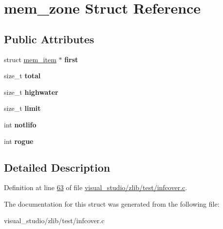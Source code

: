 \hypertarget{structmem__zone}{}\section{mem\+\_\+zone Struct Reference}
\label{structmem__zone}
\subsection*{Public Attributes}
\begin{DoxyCompactItemize}
\item 
\mbox{\label{structmem__zone_a6857b4ff436075363547bc5828b3098d}} 
struct \hyperlink{structmem__item}{mem\+\_\+item} $\ast$ {\bfseries first}
\item 
\mbox{\label{structmem__zone_a6b70eb61d9853f1280d51c0e30464b60}} 
size\+\_\+t {\bfseries total}
\item 
\mbox{\label{structmem__zone_ade7307da7e51243cb854f6572d3793ea}} 
size\+\_\+t {\bfseries highwater}
\item 
\mbox{\label{structmem__zone_a6c74826ce14e9f88852730eff93812d1}} 
size\+\_\+t {\bfseries limit}
\item 
\mbox{\label{structmem__zone_abbf8b6ad868dbd00922cd79b0218be8d}} 
int {\bfseries notlifo}
\item 
\mbox{\label{structmem__zone_add0baffc4114f0576ed2fc7eb8de21c6}} 
int {\bfseries rogue}
\end{DoxyCompactItemize}


\subsection{Detailed Description}


Definition at line \hyperlink{visual__studio_2zlib_2test_2infcover_8c_source_l00063}{63} of file \hyperlink{visual__studio_2zlib_2test_2infcover_8c_source}{visual\+\_\+studio/zlib/test/infcover.\+c}.



The documentation for this struct was generated from the following file\+:\begin{DoxyCompactItemize}
\item 
visual\+\_\+studio/zlib/test/infcover.\+c\end{DoxyCompactItemize}
